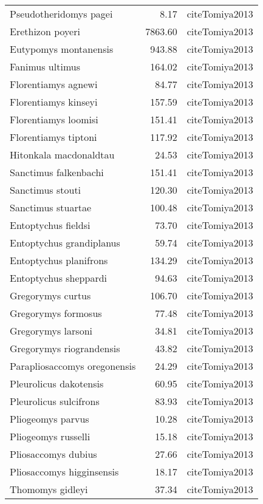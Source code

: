 \begin{table}[ht]
\begin{tabular}{lrl}
  Pseudotheridomys pagei & 8.17 & cite{Tomiya2013} \\ 
  Erethizon poyeri & 7863.60 & cite{Tomiya2013} \\ 
  Eutypomys montanensis & 943.88 & cite{Tomiya2013} \\ 
  Fanimus ultimus & 164.02 & cite{Tomiya2013} \\ 
  Florentiamys agnewi & 84.77 & cite{Tomiya2013} \\ 
  Florentiamys kinseyi & 157.59 & cite{Tomiya2013} \\ 
  Florentiamys loomisi & 151.41 & cite{Tomiya2013} \\ 
  Florentiamys tiptoni & 117.92 & cite{Tomiya2013} \\ 
  Hitonkala macdonaldtau & 24.53 & cite{Tomiya2013} \\ 
  Sanctimus falkenbachi & 151.41 & cite{Tomiya2013} \\ 
  Sanctimus stouti & 120.30 & cite{Tomiya2013} \\ 
  Sanctimus stuartae & 100.48 & cite{Tomiya2013} \\ 
  Entoptychus fieldsi & 73.70 & cite{Tomiya2013} \\ 
  Entoptychus grandiplanus & 59.74 & cite{Tomiya2013} \\ 
  Entoptychus planifrons & 134.29 & cite{Tomiya2013} \\ 
  Entoptychus sheppardi & 94.63 & cite{Tomiya2013} \\ 
  Gregorymys curtus & 106.70 & cite{Tomiya2013} \\ 
  Gregorymys formosus & 77.48 & cite{Tomiya2013} \\ 
  Gregorymys larsoni & 34.81 & cite{Tomiya2013} \\ 
  Gregorymys riograndensis & 43.82 & cite{Tomiya2013} \\ 
  Parapliosaccomys oregonensis & 24.29 & cite{Tomiya2013} \\ 
  Pleurolicus dakotensis & 60.95 & cite{Tomiya2013} \\ 
  Pleurolicus sulcifrons & 83.93 & cite{Tomiya2013} \\ 
  Pliogeomys parvus & 10.28 & cite{Tomiya2013} \\ 
  Pliogeomys russelli & 15.18 & cite{Tomiya2013} \\ 
  Pliosaccomys dubius & 27.66 & cite{Tomiya2013} \\ 
  Pliosaccomys higginsensis & 18.17 & cite{Tomiya2013} \\ 
  Thomomys gidleyi & 37.34 & cite{Tomiya2013} \\ 

\end{tabular}
\end{table}
